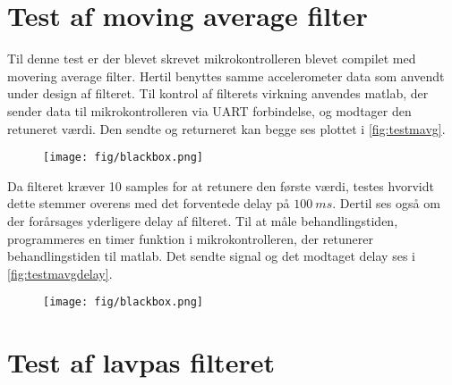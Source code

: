 \section{Test af moving average filter}
Til denne test er der blevet skrevet mikrokontrolleren blevet compilet med movering average filter. Hertil benyttes samme accelerometer data som anvendt under design af filteret. Til kontrol af filterets virkning anvendes matlab, der sender data til mikrokontrolleren via UART forbindelse, og modtager den retuneret værdi. Den sendte og returneret kan begge ses plottet i \autoref{fig:testmavg}.

\begin{figure}[H]
	\centering
	\texttt{[image: fig/blackbox.png]}
	\caption{ }
	\label{fig:testmavg}
\end{figure}


Da filteret kræver 10 samples for at retunere den første værdi, testes hvorvidt dette stemmer overens med det forventede delay på $100~ms$. Dertil ses også om der forårsages yderligere delay af filteret. Til at måle behandlingstiden, programmeres en timer funktion i mikrokontrolleren, der retunerer behandlingstiden til matlab. Det sendte signal og det modtaget delay ses i \autoref{fig:testmavgdelay}.  

\begin{figure}[H]
	\centering
	\texttt{[image: fig/blackbox.png]}
	\caption{ }
	\label{fig:testmavgdelay}
\end{figure}




\section{Test af lavpas filteret}
